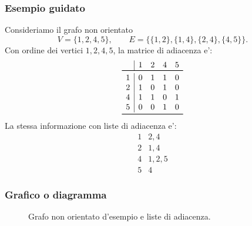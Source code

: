 \subsubsection{Esempio guidato}
Consideriamo il grafo non orientato
\[
V=\{1,2,4,5\},\qquad
E=\{\{1,2\},\{1,4\},\{2,4\},\{4,5\}\}.
\]
Con ordine dei vertici $1,2,4,5$, la matrice di adiacenza e':
\[
\begin{array}{c|cccc}
 & 1 & 2 & 4 & 5 \\
\toprule
1 & 0 & 1 & 1 & 0 \\
2 & 1 & 0 & 1 & 0 \\
4 & 1 & 1 & 0 & 1 \\
5 & 0 & 0 & 1 & 0 \\
\bottomrule
\end{array}
\]
La stessa informazione con liste di adiacenza e':
\[
\begin{array}{c|l}
1 & 2,4 \\
2 & 1,4 \\
4 & 1,2,5 \\
5 & 4
\end{array}
\]

\subsubsection{Grafico o diagramma}
\begin{figure}[H]
	\centering
	\hspace{1.5cm}
	\caption{Grafo non orientato d'esempio e liste di adiacenza.}
\end{figure}

